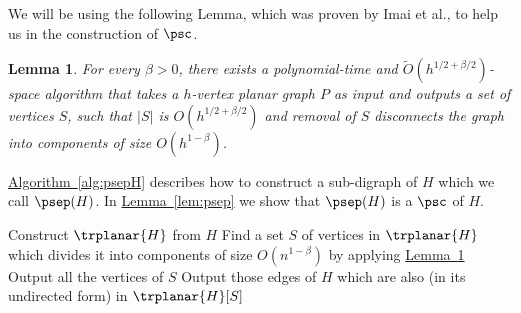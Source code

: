 \documentclass[11pt]{article}
\numberwithin{equation}{section}
\newtheorem{lemma}[theorem]{Lemma}
\theoremstyle{definition}
\theoremstyle{plain}
\newcommand{\expref}[2]{\hyperref[#2]{#1~\ref{#2}}}
\begin{document}
We will be using the following Lemma, which was proven by Imai et al., to help us in the construction of $\psc$.

\begin{lemma}\label{lem:seplemma}\cite{Imai}
For every $\beta > 0$, there exists a
%
polynomial-time   %
and $\tilde{O}(h^{1/2 + \beta/2})$-space %
algorithm that takes a $h$-vertex planar graph $P$ as input and outputs a set of vertices $S$, such that $|S|$ is $O(h^{1/2 + \beta/2})$ and removal of $S$ disconnects the graph into components of size $O(h^{1-\beta})$.
\end{lemma}

\expref{Algorithm}{alg:psepH} describes how to construct a  %
sub-digraph %
 of $H$ which we call $\psep(H)$. In \expref{Lemma}{lem:psep} we show that $\psep(H)$ is a $\psc$ of $H$.

\begin{algorithm}
\LinesNumbered
\caption{Construction of \psep(H)}
\label{alg:psepH}

Construct $\trplanar{H}$ from $H$\;
Find a set $S$ of vertices in $\trplanar{H}$ which divides it into components of size $O(n^{1-\beta})$ by applying \expref{Lemma}{lem:seplemma} \label{line:spacedom}\;
Output all the vertices of $S$\; 
Output those edges of %
$H$ which are also (in its undirected form) in $\trplanar{H}[S]$\;

\end{algorithm}
\end{document}
